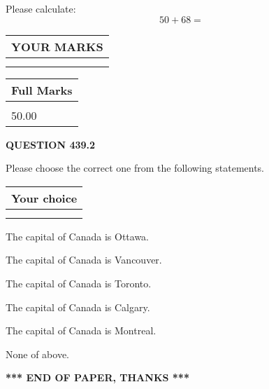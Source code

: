 \documentclass[12pt]{article}
\begin{document}
  
 
Please calculate:
\begin{equation}
50 +  %
68 = \nonumber
\end{equation}
 

 

 
  
\vspace{0.2in}
  
\noindent\begin{tabular}{|l|}
\hline
 YOUR MARKS  \\
\hline
 \\ 
 \\ 
\hline
\end{tabular}
\hspace{0.05in} \begin{tabular}{|l|}
\hline
 Full Marks  \\
\hline
 \\ 
50.00 \\
\hline
\end{tabular}
{\textbf{\Large{QUESTION
439.2 
}}}
  
  
Please choose the correct one from the following statements.
  
  
\noindent\hspace{3.0in} \begin{tabular}{|l|}
\hline
Your choice \\
\hline
 \\ 
 \\ 
\hline
\end{tabular}
  
  
 
 
The capital of Canada is Ottawa.
 
 
The capital of Canada is Vancouver.
 
 
The capital of Canada is Toronto.
 
 
The capital of Canada is Calgary.
 
 
The capital of Canada is Montreal.
 
 
 None of above.
 
 
   
   
 \vspace{0.2in}
 
   
   
   
   
\vspace{1.0in} 
{\textbf{\large{ *** END OF PAPER, THANKS *** }}} 
   
\end{document}
